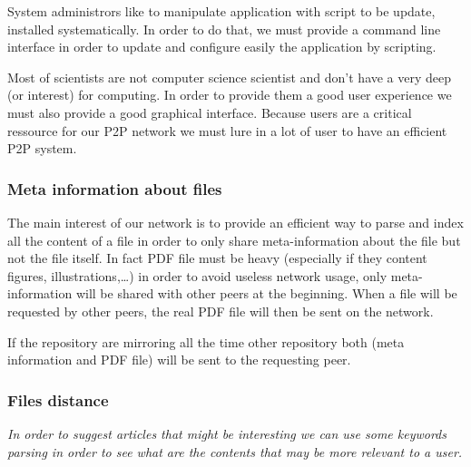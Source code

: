 System administrors like to manipulate application with script to be update, installed
systematically. In order to do that, we must provide a command line interface in order
to update and configure easily the application by scripting.

Most of scientists are not computer science scientist and don't have a very deep (or interest)
for computing. In order to provide them a good user experience we must also provide a good 
graphical interface. Because users are a critical ressource for our P2P network we 
must lure in a lot of user to have an efficient P2P system.

\subsubsection{Meta information about files}

The main interest of our network is to provide an efficient way to parse and
index all the content of a file in order to only share meta-information about the
file but not the file itself. In fact PDF file must be heavy (especially if
they content figures, illustrations,\ldots) in order to avoid useless network usage,
only meta-information will be shared with other peers at the beginning. When a file
will be requested by other peers, the real PDF file will then be sent on the network.

If the repository are mirroring all the time other repository both (meta information and
PDF file) will be sent to the requesting peer.

\subsubsection{Files distance}

\textit{In order to suggest articles that might be interesting we can use
some keywords parsing in order to see what are the contents that may be more
relevant to a user.}
